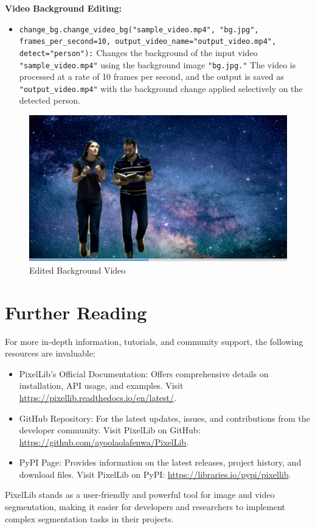 \textbf{Video Background Editing:}
\begin{itemize}
    \item \texttt{change\_bg.change\_video\_bg("sample\_video.mp4", "bg.jpg", frames\_per\_second=10, output\_video\_name="output\_video.mp4", detect="person"):} Changes the background of the input video \texttt{"sample\_video.mp4"} using the background image \texttt{"bg.jpg."} The video is processed at a rate of 10 frames per second, and the output is saved as \texttt{"output\_video.mp4"} with the background change applied selectively on the detected person.
\end{itemize}
\begin{figure}[h!]
    \centering
    \includegraphics[width=0.8\linewidth]{Images/PixelLib/video2.png} %
    
    \caption{Edited Background Video}
    \label{fig:your_image_label}
\end{figure}





\section{Further Reading}
For more in-depth information, tutorials, and community support, the following resources are invaluable:

\begin{itemize}
    \item PixelLib's Official Documentation: Offers comprehensive details on installation, API usage, and examples. Visit \url{https://pixellib.readthedocs.io/en/latest/}.
    
    \item GitHub Repository: For the latest updates, issues, and contributions from the developer community. Visit PixelLib on GitHub: \url{https://github.com/ayoolaolafenwa/PixelLib}.
    
    \item PyPI Page: Provides information on the latest releases, project history, and download files. Visit PixelLib on PyPI: \url{https://libraries.io/pypi/pixellib}.
\end{itemize}

PixelLib stands as a user-friendly and powerful tool for image and video segmentation, making it easier for developers and researchers to implement complex segmentation tasks in their projects.


